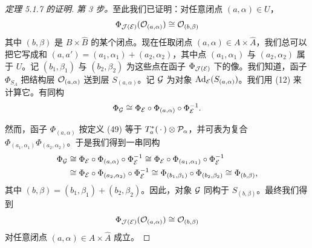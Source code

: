 \begin{proof}[定理 5.1.7 的证明]
\emph{第 3 步。}至此我们已证明：对任意闭点 $(a,\alpha)\in U$，
\begin{equation*}
\Phi_{\mathcal{J}(\mathcal{E})}(\mathcal{O}_{(a,\alpha)})\cong\mathcal{O}_{(b,\beta)}
\end{equation*}
其中 $(b,\beta)$ 是 $B\times\hat B$ 的某个闭点。现在任取闭点 $(a,\alpha)\in A\times\hat A$，我们总可以把它写成和 $(a,a')=(a_1,\alpha_1)+(a_2,\alpha_2)$，其中点 $(a_1,\alpha_1)$ 与 $(a_2,\alpha_2)$ 属于 $U$。记 $(b_1,\beta_1)$ 与 $(b_2,\beta_2)$ 为这些点在函子 $\Phi_{\mathcal{J}(\mathcal{E})}$ 下的像。我们知道，函子 $\Phi_{S_A}$ 把结构层 $\mathcal{O}_{(a,\alpha)}$ 送到层 $S_{(a,\alpha)}$。记 $\mathcal{G}$ 为对象 $\mathrm{Ad}_{\mathcal{E}}(S_{(a,\alpha)})$。我们用 (12) 来计算它。有同构
\begin{equation*}
\Phi_{\mathcal{G}}\cong\Phi_{\mathcal{E}}\circ\Phi_{(a,\alpha)}\circ\Phi_{\mathcal{E}}^{-1}.
\end{equation*}

然而，函子 $\Phi_{(a,\alpha)}$ 按定义 (49) 等于 $T^*_a(\,\cdot\,)\otimes\mathcal{P}_\alpha$，并可表为复合 $\Phi_{(a_1,\alpha_1)}\Phi_{(a_2,\alpha_2)}$。于是我们得到一串同构
\begin{equation*}
\begin{aligned}
\Phi_{\mathcal{G}}&\cong\Phi_{\mathcal{E}}\circ\Phi_{(a,\alpha)}\circ\Phi_{\mathcal{E}}^{-1}
\cong\Phi_{\mathcal{E}}\circ\Phi_{(a_1,\alpha_1)}\circ\Phi_{\mathcal{E}}^{-1}\\
&\cong\Phi_{\mathcal{E}}\circ\Phi_{(a_2,\alpha_2)}\circ\Phi_{\mathcal{E}}^{-1}
\cong\Phi_{(b_1,\beta_1)}\circ\Phi_{(b_2,\beta_2)}\cong\Phi_{(b,\beta)},
\end{aligned}
\end{equation*}
其中 $(b,\beta)=(b_1,\beta_1)+(b_2,\beta_2)$。因此，对象 $\mathcal{G}$ 同构于 $S_{(b,\beta)}$。最终我们得到
\begin{equation*}
\Phi_{\mathcal{J}(\mathcal{E})}(\mathcal{O}_{(a,\alpha)})\cong\mathcal{O}_{(b,\beta)}
\end{equation*}
对任意闭点 $(a,\alpha)\in A\times\hat A$ 成立。



\end{proof}
